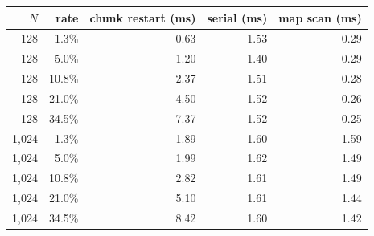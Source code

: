 \begin{tabular}{rrrrr}
\toprule
$N$ & rate & chunk restart (ms) & serial (ms) & map scan (ms)\\
\midrule
128 & 1.3\% & 0.63 & 1.53 & 0.29\\
128 & 5.0\% & 1.20 & 1.40 & 0.29\\
128 & 10.8\% & 2.37 & 1.51 & 0.28\\
128 & 21.0\% & 4.50 & 1.52 & 0.26\\
128 & 34.5\% & 7.37 & 1.52 & 0.25\\
1{,}024 & 1.3\% & 1.89 & 1.60 & 1.59\\
1{,}024 & 5.0\% & 1.99 & 1.62 & 1.49\\
1{,}024 & 10.8\% & 2.82 & 1.61 & 1.49\\
1{,}024 & 21.0\% & 5.10 & 1.61 & 1.44\\
1{,}024 & 34.5\% & 8.42 & 1.60 & 1.42\\
\bottomrule
\end{tabular}

